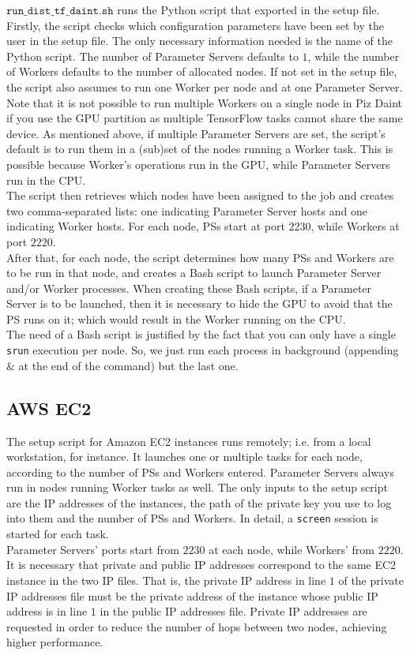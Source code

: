$\texttt{run\_dist\_tf\_daint.sh}$ runs the Python script that exported in the setup file.\\
Firstly, the script checks which configuration parameters have been set by the user in the setup file.
The only necessary information needed is the name of the Python script.
The number of Parameter Servers defaults to $1$, while the number of Workers defaults to the number of allocated nodes.
If not set in the setup file, the script also assumes to run one Worker per node and at one Parameter Server.
Note that it is not possible to run multiple Workers on a single node in Piz Daint if you use the GPU partition as multiple TensorFlow tasks cannot share the same device.
As mentioned above, if multiple Parameter Servers are set, the script's default is to run them in a (sub)set of the nodes running a Worker task.
This is possible because Worker's operations run in the GPU, while Parameter Servers run in the CPU.\\
The script then retrieves which nodes have been assigned to the job and creates two comma-separated lists: one indicating Parameter Server hosts and one indicating Worker hosts.
For each node, PSs start at port $2230$, while Workers at port $2220$.\\
After that, for each node, the script determines how many PSs and Workers are to be run in that node, and creates a Bash script to launch Parameter Server and/or Worker processes.
When creating these Bash scripts, if a Parameter Server is to be launched, then it is necessary to hide the GPU to avoid that the PS runs on it; which would result in the Worker running on the CPU.\\
The need of a Bash script is justified by the fact that you can only have a single \texttt{srun} execution per node.
So, we just run each process in background (appending $\texttt{\&}$ at the end of the command) but the last one.

\subsection{AWS EC2}
The setup script for Amazon EC2 instances runs remotely; i.e. from a local workstation, for instance.
It launches one or multiple tasks for each node, according to the number of PSs and Workers entered.
Parameter Servers always run in nodes running Worker tasks as well.
The only inputs to the setup script are the IP addresses of the instances, the path of the private key you use to log into them and the number of PSs and Workers.
In detail, a \texttt{screen} session is started for each task.\\
Parameter Servers' ports start from $2230$ at each node, while Workers' from $2220$.\\
It is necessary that private and public IP addresses correspond to the same EC2 instance in the two IP files. 
That is, the private IP address in line $1$ of the private IP addresses file must be the private address of the instance whose public IP address is in line $1$ in the public IP addresses file.
Private IP addresses are requested in order to reduce the number of hops between two nodes, achieving higher performance.\\

